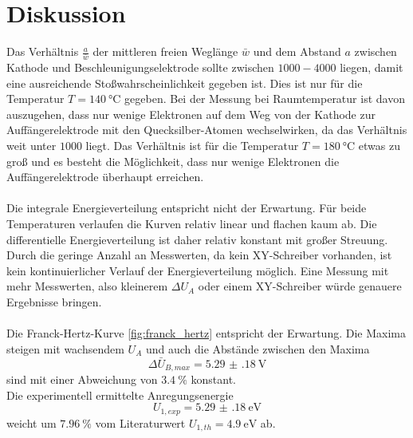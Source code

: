 \section{Diskussion}
\label{sec:Diskussion}
Das Verhältnis $\frac{a}{\bar{w}}$ der mittleren freien Weglänge $\bar{w}$ und dem Abstand $a$ zwischen Kathode und Beschleunigungselektrode sollte zwischen $1000 - 4000$ liegen, damit eine ausreichende Stoßwahrscheinlichkeit gegeben ist.
Dies ist nur für die Temperatur $T = \SI{140}{\degreeCelsius}$ gegeben.
Bei der Messung bei Raumtemperatur ist davon auszugehen, dass nur wenige Elektronen auf dem Weg von der Kathode zur Auffängerelektrode mit den Quecksilber-Atomen wechselwirken, da das Verhältnis weit unter $1000$ liegt.
Das Verhältnis ist für die Temperatur $T = \SI{180}{\degreeCelsius}$ etwas zu groß und es besteht die Möglichkeit, dass nur wenige Elektronen die Auffängerelektrode überhaupt erreichen.
\\
\\
Die integrale Energieverteilung entspricht nicht der Erwartung.
Für beide Temperaturen verlaufen die Kurven relativ linear und flachen kaum ab.
Die differentielle Energieverteilung ist daher relativ konstant mit großer Streuung.
\\
Durch die geringe Anzahl an Messwerten, da kein XY-Schreiber vorhanden, ist kein kontinuierlicher Verlauf der Energieverteilung möglich.
Eine Messung mit mehr Messwerten, also kleinerem $\Delta U_A$ oder einem XY-Schreiber würde genauere Ergebnisse bringen.
\\
\\
Die Franck-Hertz-Kurve \ref{fig:franck_hertz} entspricht der Erwartung.
Die Maxima steigen mit wachsendem $U_A$ und auch die Abstände zwischen den Maxima
\begin{equation*}
    \Delta \bar{U}_{B,max} = \SI{5.29(18)}{\volt}
\end{equation*}
sind mit einer Abweichung von $\SI{3.4}{\percent}$ konstant.
\\
Die experimentell ermittelte Anregungsenergie
\begin{equation*}
    U_{1,exp} = \SI{5.29(18)}{\electronvolt}
\end{equation*}
weicht um $\SI{7.96}{\percent}$ vom Literaturwert \cite{anregungsenergie} ${U_{1,th} = \SI{4.9}{\electronvolt}}$ ab.
